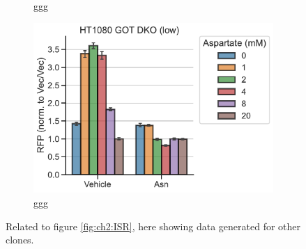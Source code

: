 \begin{figure}
\begin{subfigure}[b]{0.4\textwidth}
         \caption{ggg}
         \label{fig:app_ch2:HT1080_Atp_ATF4rep}
     \end{subfigure}
     \hspace{0.06\textwidth}
     \begin{subfigure}[b]{0.4\textwidth}
         \includegraphics[width=\textwidth]{figures/chap2/app/HT1080_GOT_DKO_Asp_ATF4rep.pdf}
         \caption{ggg}
         \label{fig:app_ch2:HT1080_GOT_DKO_Asp_ATF4rep}
     \end{subfigure}
        \caption[ggg]{
        Related to figure \ref{fig:ch2:ISR}, here showing data generated for other clones.
        }
        \label{fig:app_ch2:ISR}
\end{figure}










